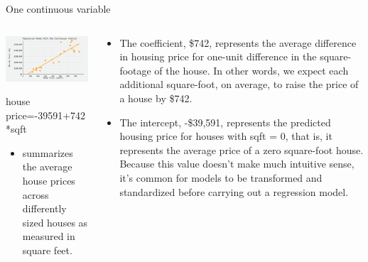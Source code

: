 \documentclass[australian,ignorenonframetext,aspectratio=169]{beamer}
\providecommand{\tightlist}{%
  \setlength{\itemsep}{0pt}\setlength{\parskip}{0pt}}
\begin{document}
\begin{frame}{One continuous variable}
\protect\hypertarget{one-continuous-variable}{}

\begin{columns}[T]
\begin{column}{0.5\textwidth}
\begin{center}\includegraphics[width=1\linewidth]{../graphs/interpret-2} \end{center}

house price=-39591+742*sqft

\begin{itemize}
\tightlist
\item
  summarizes the average house prices across differently sized houses as
  measured in square feet.
\end{itemize}
\end{column}

\begin{column}{0.5\textwidth}
\small

\begin{itemize}
\item
  The coefficient, \$742, represents the average difference in housing
  price for one-unit difference in the square-footage of the house. In
  other words, we expect each additional square-foot, on average, to
  raise the price of a house by \$742.
\item
  The intercept, -\$39,591, represents the predicted housing price for
  houses with sqft = 0, that is, it represents the average price of a
  zero square-foot house. Because this value doesn't make much intuitive
  sense, it's common for models to be transformed and standardized
  before carrying out a regression model.
\end{itemize}
\end{column}
\end{columns}

\end{frame}
\end{document}
